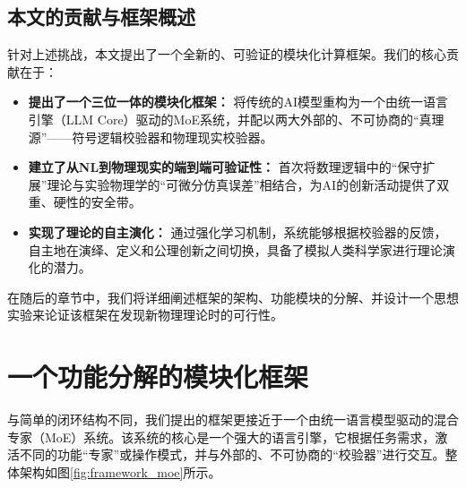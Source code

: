 \documentclass[11pt, a4paper]{article}
\begin{document}
\subsection{本文的贡献与框架概述}

针对上述挑战，本文提出了一个全新的、可验证的模块化计算框架。我们的核心贡献在于：

\begin{itemize}
	\item \textbf{提出了一个三位一体的模块化框架：} 将传统的AI模型重构为一个由统一语言引擎（LLM Core）驱动的MoE系统，并配以两大外部的、不可协商的“真理源”——符号逻辑校验器和物理现实校验器。
	\item \textbf{建立了从NL到物理现实的端到端可验证性：} 首次将数理逻辑中的“保守扩展”理论与实验物理学的“可微分仿真误差”相结合，为AI的创新活动提供了双重、硬性的安全带。
	\item \textbf{实现了理论的自主演化：} 通过强化学习机制，系统能够根据校验器的反馈，自主地在演绎、定义和公理创新之间切换，具备了模拟人类科学家进行理论演化的潜力。
\end{itemize}

在随后的章节中，我们将详细阐述框架的架构、功能模块的分解、并设计一个思想实验来论证该框架在发现新物理理论时的可行性。
\section{一个功能分解的模块化框架}
与简单的闭环结构不同，我们提出的框架更接近于一个由统一语言模型驱动的混合专家（MoE）系统。该系统的核心是一个强大的语言引擎，它根据任务需求，激活不同的功能“专家”或操作模式，并与外部的、不可协商的“校验器”进行交互。整体架构如图\ref{fig:framework_moe}所示。
\end{document}

